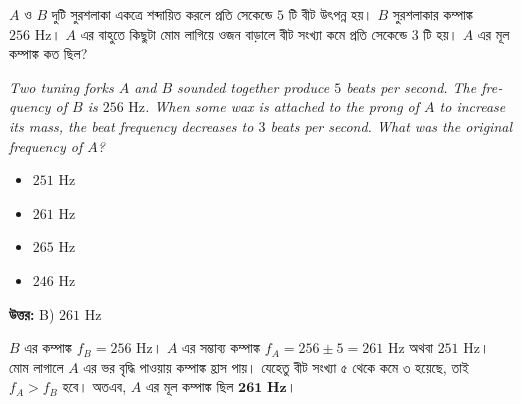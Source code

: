 \documentclass[12pt, a4paper]{article}
\begin{document}
\vspace{2em}

\begin{tcolorbox}[questionbox={প্রশ্ন (Question) 13}]
    \noindent
    $A$ ও $B$ দুটি সুরশলাকা একত্রে শব্দায়িত করলে প্রতি সেকেন্ডে $5$ টি বীট উৎপন্ন হয়। $B$ সুরশলাকার কম্পাঙ্ক $256\text{ Hz}$। $A$ এর বাহুতে কিছুটা মোম লাগিয়ে ওজন বাড়ালে বীট সংখ্যা কমে প্রতি সেকেন্ডে $3$ টি হয়। $A$ এর মূল কম্পাঙ্ক কত ছিল?
    
    \vspace{0.8em}
    \begin{english}
    \noindent\textit{\color{darkgray}
    Two tuning forks $A$ and $B$ sounded together produce $5$ beats per second. The frequency of $B$ is $256\text{ Hz}$. When some wax is attached to the prong of $A$ to increase its mass, the beat frequency decreases to $3$ beats per second. What was the original frequency of $A$?
    }
    \end{english}
\end{tcolorbox}

\begin{itemize}[label={}, leftmargin=1cm, itemsep=0.5em]
    \item[\textbf{A)}] $251\text{ Hz}$
    \item[\textbf{B)}] $261\text{ Hz}$
    \item[\textbf{C)}] $265\text{ Hz}$
    \item[\textbf{D)}] $246\text{ Hz}$
\end{itemize}

\vspace{0.5em}
\begin{tcolorbox}[answerbox]
    \textbf{\color{success} উত্তর:} B) $261\text{ Hz}$
\end{tcolorbox}
\vspace{1em}

\begin{tcolorbox}[solutionbox={সমাধান (Solution)}]
    \noindent
    $B$ এর কম্পাঙ্ক $f_B = 256\text{ Hz}$। $A$ এর সম্ভাব্য কম্পাঙ্ক $f_A = 256 \pm 5 = 261\text{ Hz}$ অথবা $251\text{ Hz}$। মোম লাগালে $A$ এর ভর বৃদ্ধি পাওয়ায় কম্পাঙ্ক হ্রাস পায়। যেহেতু বীট সংখ্যা ৫ থেকে কমে ৩ হয়েছে, তাই $f_A > f_B$ হবে। অতএব, $A$ এর মূল কম্পাঙ্ক ছিল $\mathbf{261\text{ Hz}}$।
\end{tcolorbox}

\vspace{2em}
\end{document}
